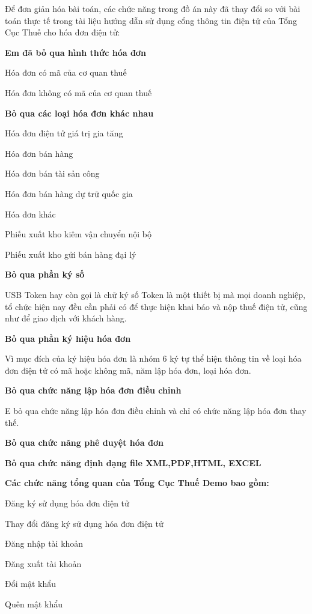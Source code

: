 Để đơn giản hóa bài toán, các chức năng trong đồ án này đã thay đổi so với bài toán thực tế trong tài liệu hướng dẫn sử dụng cổng thông tin điện tử của Tổng Cục Thuế cho hóa đơn điện tử:

\textbf{Em đã bỏ qua hình thức hóa đơn}

Hóa đơn có mã của cơ quan thuế

Hóa đơn không có mã của cơ quan thuế

\textbf{Bỏ qua các loại hóa đơn khác nhau}

Hóa đơn điện tử giá trị gia tăng

Hóa đơn bán hàng

Hóa đơn bán tài sản công

Hóa đơn bán hàng dự trữ quốc gia

Hóa đơn khác

Phiếu xuất kho kiêm vận chuyển nội bộ

Phiếu xuất kho gửi bán hàng đại lý

\textbf{Bỏ qua phần ký số}

USB Token hay còn gọi là chữ ký số Token là một thiết bị mà mọi doanh nghiệp, tổ chức hiện nay đều cần phải có để thực hiện khai báo và nộp thuế điện tử, cũng như để giao dịch với khách hàng.

\textbf{Bỏ qua phần ký hiệu hóa đơn}

Vì mục đích của ký hiệu hóa đơn là nhóm 6 ký tự thể hiện thông tin về loại hóa đơn điện tử có mã hoặc không mã, năm lập hóa đơn, loại hóa đơn.

\textbf{Bỏ qua chức năng lập hóa đơn điều chỉnh}

E bỏ qua chức năng lập hóa đơn điều chỉnh và chỉ có chức năng lập hóa đơn thay thế.

\textbf{Bỏ qua chức năng phê duyệt hóa đơn}

\textbf{Bỏ qua chức năng định dạng file XML,PDF,HTML, EXCEL}

\textbf{Các chức năng tổng quan của Tổng Cục Thuế Demo bao gồm:}


Đăng ký sử dụng hóa đơn điện tử

Thay đổi đăng ký sử dụng hóa đơn điện tử

Đăng nhập tài khoản

Đăng xuất tài khoản

Đổi mật khẩu

Quên mật khẩu



